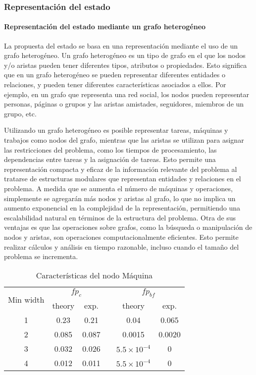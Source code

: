 \subsubsection{Representación del estado}
\paragraph{Representación del estado mediante un grafo heterogéneo}
La propuesta del estado se basa en una representación mediante el uso de un grafo heterogéneo. Un grafo 
heterogéneo es un tipo de grafo en el que los nodos y/o aristas pueden tener diferentes tipos, atributos 
o propiedades. Esto significa que en un grafo heterogéneo se pueden representar diferentes entidades 
o relaciones, y pueden tener diferentes características asociados a ellos. Por ejemplo, en un grafo 
que representa una red social, los nodos pueden representar personas, páginas o grupos y 
las aristas amistades, seguidores, miembros de un grupo, etc.\medskip 

Utilizando un grafo heterogéneo es posible representar tareas, máquinas y trabajos como nodos del grafo, 
mientras que las aristas se utilizan para asignar las restricciones del problema, como los tiempos de 
procesamiento, las dependencias entre tareas y la asignación de tareas. Esto permite una representación 
compacta y eficaz de la información relevante del problema al tratarse de estructuras modulares que 
representan entidades y relaciones en el problema. A medida que se aumenta el número de máquinas y 
operaciones, simplemente se agregarán más nodos y aristas al grafo, lo que no implica un aumento exponencial 
en la complejidad de la representación, permitiendo una escalabilidad natural en términos de la estructura 
del problema. Otra de sus ventajas es que las operaciones sobre grafos, como la búsqueda o manipulación de 
nodos y aristas, son operaciones computacionalmente eficientes. Esto permite realizar cálculos y 
análisis en tiempo razonable, incluso cuando el tamaño del problema se incrementa. 

\begin{table}[ht]
    \caption{Características del nodo Máquina} 
    \centering 
    
    \begin{tabular}{cccccc} 
    \toprule

    \multirow{2}{*}{
    \parbox[c]{.2\linewidth}{\centering Min width}}
      & \multicolumn{2}{c}{$fp_{c}$} &&
    \multicolumn{2}{c}{$fp_{bf}$} \\ 
    \cmidrule{2-3} \cmidrule{5-6}
    
     & {\centering theory} & {exp.} && {theory} & {exp.}  \\
    \midrule
    1 & 0.23  & 0.21  && 0.04               & 0.065 \\
    2 & 0.085 & 0.087 && 0.0015             & 0.0020 \\
    3 & 0.032 & 0.026 && $5.5\times10^{-4}$ & 0 \\
    4 & 0.012 & 0.011 && $5.5\times10^{-4}$ & 0 \\
    \bottomrule

    \end{tabular}
\end{table}


